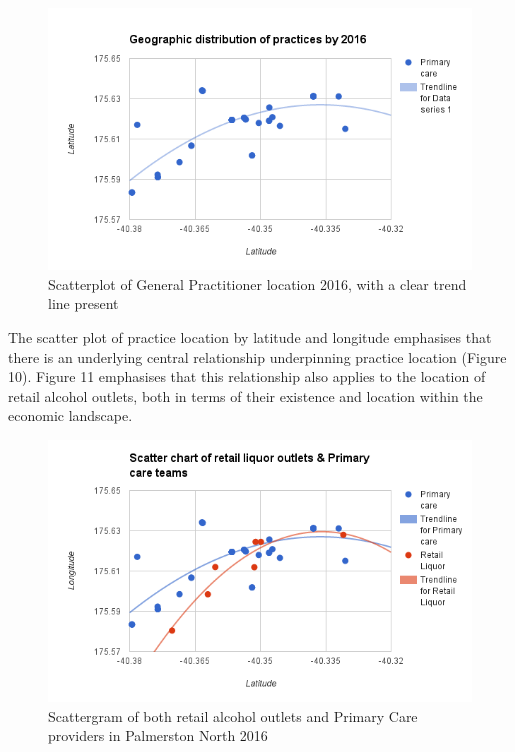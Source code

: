 \documentclass[11pt,a4paper]{article}
\begin{document}
\begin{figure}[htp]
\centering
\includegraphics[scale=0.6]{Nash_GP_2016.png}
\caption{Scatterplot of General Practitioner location 2016, with a clear trend line present}
\label{Scatter plot of General Practitioner locations}
\end{figure}


The scatter plot of practice location by latitude and longitude emphasises that there is an underlying central relationship underpinning practice location (Figure 10). Figure 11 emphasises that this relationship also applies to the location of retail alcohol outlets, both in terms of their existence and location within the economic landscape.\\


\begin{figure}[htp]
\centering
\includegraphics[scale=0.6]{Nash_GP_retail.png}
\caption{ Scattergram of both retail alcohol outlets and Primary Care providers in Palmerston North 2016}
\label{Geographic distribution of practices by 2016, with retail outlets overlaid}
\end{figure}
\end{document}
